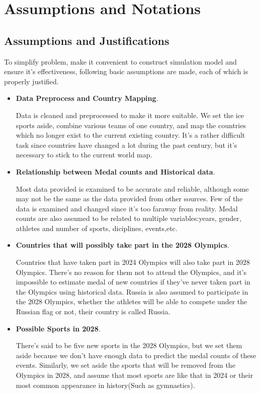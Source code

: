 
\section{Assumptions and Notations}

\subsection*{Assumptions and Justifications}

To simplify problem, make it convenient to construct simulation model and ensure it's effectiveness, following basic assumptions are made, each of which is properly justified.

\begin{itemize}
\item {\bf Data Preprocess and Country Mapping}. 

Data is cleaned and preprocessed to make it more suitable. We set the ice sports aside, combine various teams of one country, and map the countries which no longer exist to the current existing country. It's a rather difficult task since countries have changed a lot during the past century, but it's necessary to stick to the current world map.

\item {\bf Relationship between Medal counts and Historical data}. 

Most data provided is examined to be accurate and reliable, although some may not be the same as the data provided from other sources. Few of the data is examined and changed since it's too faraway from reality. Medal counts are also assumed to be related to multiple variables:years, gender, athletes and number of sports, diciplines, events,etc.

\item {\bf Countries that will possibly take part in the 2028 Olympics}. 

Countries that have taken part in 2024 Olympics will also take part in 2028 Olympics. There's no reason for them not to attend the Olympics, and it's impossible to estimate medal of new countries if they've never taken part in the Olympics using historical data. Russia is also assumed to participate in the 2028 Olympics, whether the athletes will be able to compete under the Russian flag or not, their country is called Russia. 

\item {\bf Possible Sports in 2028}. 

There's said to be five new sports in the 2028 Olympics, but we set them aside because we don't have enough data to predict the medal counts of these events. Similarly, we set aside the sports that will be removed from the Olympics in 2028, and assume that most sports are like that in 2024 or their most common appearance in history(Such as gymnastics).


\end{itemize}

